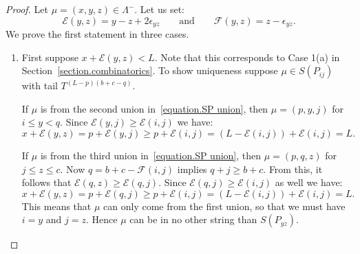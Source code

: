 \documentclass[11pt,reqno]{amsart}
\theoremstyle{definition}
\numberwithin{equation}{section}
\begin{document}
\begin{proof}
Let $\mu=(x,y,z) \in \Lambda^-$. Let us set:
\[
	\mathcal{E}(y,z)=y-z+2\epsilon_{yz} \qquad \text{and} \qquad
	\mathcal{F}(y,z)=z-\epsilon_{yz}.
\]
We prove the first statement in three cases.
\begin{enumerate}
\item{First suppose $x+\mathcal{E}(y,z)<L$. Note that this corresponds to Case 1(a) in Section~\ref{section.combinatorics}.
To show uniqueness suppose $\mu \in S(P_{ij})$ with tail $T^{(L-p)(b+c-q)}$. 

If $\mu$ is from the second union in~\eqref{equation.SP union}, then $\mu=(p,y,j)$ for $i \leqslant y <q$. Since 
$\mathcal{E}(y,j) \geqslant \mathcal{E}(i,j)$ we have:
\begin{equation*}
	x+\mathcal{E}(y,z)=p+\mathcal{E}(y,j) \geqslant p+ \mathcal{E}(i,j)=  (L-\mathcal{E}(i,j))+\mathcal{E}(i,j)=L.
\end{equation*}

If $\mu$ is from the third union in~\eqref{equation.SP union}, then $\mu = (p,q,z)$ for $j \leqslant z \leqslant c$. 
Now $q=b+c-\mathcal{F}(i,j)$ implies $q+j \geqslant b+c$. From this, it follows that $\mathcal{E}(q,z) \geqslant 
\mathcal{E}(q,j)$.  Since $\mathcal{E}(q,j) \geqslant \mathcal{E}(i,j)$ as well we have:
\begin{equation*}
	x+\mathcal{E}(y,z)=p+\mathcal{E}(q,j)  \geqslant p+ \mathcal{E}(i,j)=  (L-\mathcal{E}(i,j))+\mathcal{E}(i,j)=L.
\end{equation*}
This means that $\mu$ can only come from the first union, so that we must have $i=y$ and $j=z$.  Hence $\mu$ can be 
in no other string than $S(P_{yz})$.

}
\end{enumerate}
\end{proof}
\end{document}
